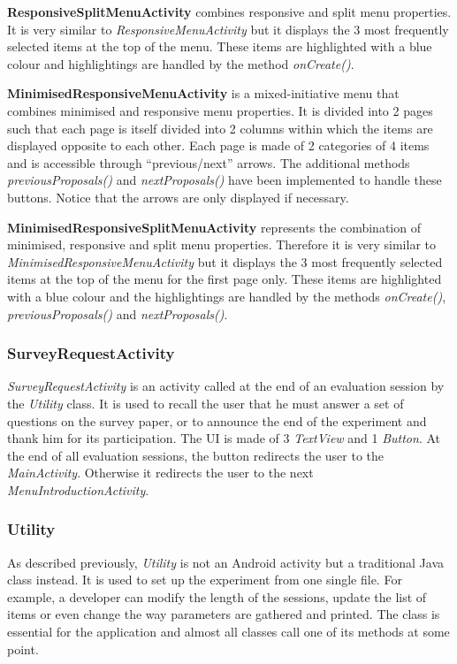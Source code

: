 \textbf{ResponsiveSplitMenuActivity} combines responsive and split menu 
properties. It is very similar to \textit{ResponsiveMenuActivity} but 
it displays the 3 most frequently selected items at the top of the menu. These 
items are highlighted with a blue colour and highlightings are handled by the 
method \textit{onCreate()}.\newline

\textbf{MinimisedResponsiveMenuActivity} is a mixed-initiative menu 
that combines minimised and responsive menu properties. It is divided 
into 2 pages such that each page is itself divided into 2 columns 
within which the items are displayed opposite to each other. Each page is made 
of 2 categories of 4 items and is accessible through \enquote{previous/next} 
arrows. The additional methods \textit{previousProposals()} and 
\textit{nextProposals()} have been implemented to handle these buttons. 
Notice that the arrows are only displayed if necessary.\newline

\textbf{MinimisedResponsiveSplitMenuActivity} represents the 
combination of minimised, responsive and split menu properties. 
Therefore it is very similar to \textit{MinimisedResponsiveMenuActivity} 
but it displays the 3 most frequently selected items at the top of the menu for 
the first page only. These items are highlighted with a blue colour and the 
highlightings are handled by the methods \textit{onCreate()}, 
\textit{previousProposals()} and \textit{nextProposals()}.

\subsubsection{SurveyRequestActivity}
\textit{SurveyRequestActivity} is an activity called at the end of an 
evaluation session by the \textit{Utility} class. It is used to recall the user 
that he must answer a set of questions on the survey paper, or to announce the 
end of the experiment and thank him for its participation. The UI is made of 3 
\textit{TextView} and 1 \textit{Button}. At the end of all evaluation 
sessions, the button redirects the user to the \textit{MainActivity}. Otherwise 
it redirects the user to the next \textit{MenuIntroductionActivity}.

\subsubsection{Utility}
As described previously, \textit{Utility} is not an Android activity but a 
traditional Java class instead. It is used to set up the experiment from one 
single file. For example, a developer can modify the length of the sessions, 
update the list of items or even change the way parameters are gathered and 
printed. The class is essential for the application and almost all classes call 
one of its methods at some point.